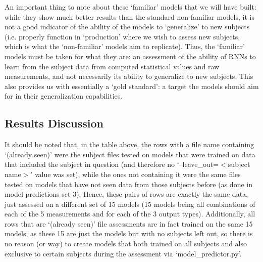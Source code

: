 \documentclass[12pt,twoside]{report}
\begin{document}
\quad An important thing to note about these ‘familiar’ models that we will have built: while they show much better results than the standard non-familiar models, it is not a good indicator of the ability of the models to ‘generalize’ to new subjects (i.e. properly function in ‘production’ where we wish to assess new subjects, which is what the ‘non-familiar’ models aim to replicate). Thus, the ‘familiar’ models must be taken for what they are: an assessment of the ability of RNNs to learn from the subject data from computed statistical values and raw measurements, and not necessarily its ability to generalize to new subjects. This also provides us with essentially a ‘gold standard’: a target the models should aim for in their generalization capabilities.

\subsection{Results Discussion}

\quad It should be noted that, in the table above, the rows with a file name containing ‘(already seen)’ were the subject files tested on models that were trained on data that included the subject in question (and therefore no ‘--leave\_out=$<$subject name$>$’ value was set), while the ones not containing it were the same files tested on models that have not seen data from those subjects before (as done in model predictions set 3). Hence, these pairs of rows are exactly the same data, just assessed on a different set of 15 models (15 models being all combinations of each of the 5 measurements and for each of the 3 output types). Additionally, all rows that are ‘(already seen)’ file assessments are in fact trained on the same 15 models, as these 15 are just the models but with no subjects left out, so there is no reason (or way) to create models that both trained on all subjects and also exclusive to certain subjects during the assessment via ‘model\_predictor.py’.\\
\end{document}
